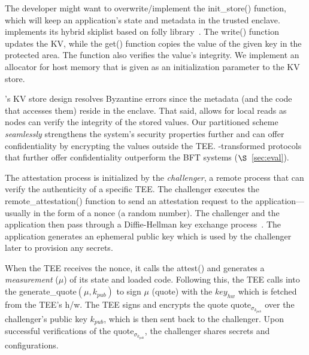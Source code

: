 The developer might want to overwrite/implement the init\_store() function, which will keep an application's state and metadata in the trusted enclave. \projecttitle{} implements its hybrid skiplist based on folly library~\cite{folly}. The write() function updates the KV, while the get() function copies the value of the given key in the protected area. The function also verifies the value's integrity. We implement an allocator for host memory that is given as an initialization parameter to the KV store.


\fi 
\projecttitle{}'s KV store design resolves Byzantine errors since the metadata (and the code that accesses them) reside in the enclave. That said, \projecttitle{} allows for local reads as nodes can verify the integrity of the stored values. Our partitioned scheme {\em seamlessly} strengthens the system's security properties further and can offer confidentiality by encrypting the values outside the TEE. \projecttitle{}-transformed protocols that further offer confidentiality outperform the BFT systems ($
\S$~\ref{sec:eval}).









 The attestation process is initialized by the \emph{challenger}, a remote process that can verify the authenticity of a specific TEE. The challenger executes the remote\_attestation() function to send an attestation request to the application---usually in the form of a nonce (a random number). The challenger and the application then pass through a Diffie-Hellman key exchange process~\cite{10.1145/359460.359473}. The application generates an ephemeral public key which is used by the challenger later to provision any secrets.

When the TEE receives the nonce, it calls the attest() and generates a \emph{measurement} ($\mu$) of its state and loaded code. Following this, the TEE calls into the generate\_quote$(\mu, k_{pub})$ to sign $\mu$ (quote) with the $key_{hw}$ which is fetched from the TEE's h/w. The TEE signs and encrypts the quote quote$_{\sigma_{k_{pub}}}$ over the challenger's public key $k_{pub}$, which is then sent back to the challenger. Upon successful verifications of the quote$_{\sigma_{k_{pub}}}$, the challenger shares secrets and configurations.

